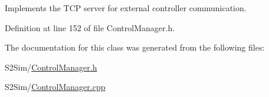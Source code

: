 Implements the T\-C\-P server for external controller communication. 



Definition at line 152 of file Control\-Manager.\-h.



The documentation for this class was generated from the following files\-:\begin{DoxyCompactItemize}
\item 
S2\-Sim/\hyperlink{_control_manager_8h}{Control\-Manager.\-h}\item 
S2\-Sim/\hyperlink{_control_manager_8cpp}{Control\-Manager.\-cpp}\end{DoxyCompactItemize}
